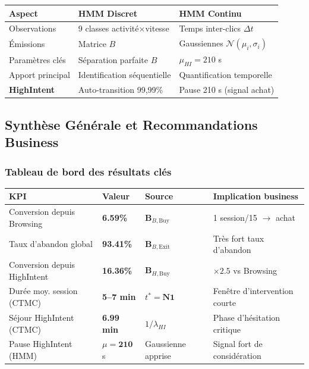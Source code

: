 \documentclass[11pt,a4paper]{article}
\renewcommand{\arraystretch}{1.35}
\newcommand{\mat}[1]{\mathbf{#1}}
\begin{document}
\begin{center}
\begin{tabular}{lll}
\toprule
\textbf{Aspect} & \textbf{HMM Discret} & \textbf{HMM Continu} \\
\midrule
\rowcolor{LightGray} Observations & 9 classes activité$\times$vitesse & Temps inter-clics $\Delta t$ \\
Émissions & Matrice $B$ & Gaussiennes $\mathcal{N}(\mu_i, \sigma_i)$ \\
\rowcolor{LightGray} Paramètres clés & Séparation parfaite $B$ & $\mu_{HI} = 210$ s \\
Apport principal & Identification séquentielle & Quantification temporelle \\
\rowcolor{LightBlue}\textbf{HighIntent} & Auto-transition 99,99\% & Pause 210 s (signal achat) \\
\bottomrule
\end{tabular}
\end{center}



\subsection{Synthèse Générale et Recommandations Business}

\subsubsection{Tableau de bord des résultats clés}

\begin{center}
\renewcommand{\arraystretch}{1.4}
\begin{tabularx}{\textwidth}{lXXX}
\toprule
\rowcolor{DarkBlue}
\color{white}\textbf{KPI} &
\color{white}\textbf{Valeur} &
\color{white}\textbf{Source} &
\color{white}\textbf{Implication business} \\
\midrule
Conversion depuis Browsing &
  \cellcolor{LightBuy}\textbf{6.59\%} & $\mat{B}_{B,\text{Buy}}$ &
  1 session/15 $\to$ achat \\
\rowcolor{LightGray}
Taux d'abandon global &
  \cellcolor{LightRed}\textbf{93.41\%} & $\mat{B}_{B,\text{Exit}}$ &
  Très fort taux d'abandon \\
Conversion depuis HighIntent &
  \textbf{16.36\%} & $\mat{B}_{H,\text{Buy}}$ &
  $\times 2.5$ vs Browsing \\
\rowcolor{LightGray}
Durée moy. session (CTMC) &
  \textbf{5--7 min} & $t^* = \mat{N}\mathbf{1}$ &
  Fenêtre d'intervention courte \\
Séjour HighIntent (CTMC) &
  \textbf{6.99 min} & $1/\lambda_{HI}$ &
  Phase d'hésitation critique \\
\rowcolor{LightGray}
Pause HighIntent (HMM) &
  $\mu = \mathbf{210}$ s & Gaussienne apprise &
  Signal fort de considération \\
\bottomrule
\end{tabularx}
\end{center}
\end{document}
